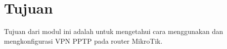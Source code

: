 \section*{Tujuan}

Tujuan dari modul ini adalah untuk mengetahui cara menggunakan dan mengkonfigurasi VPN PPTP pada router MikroTik.